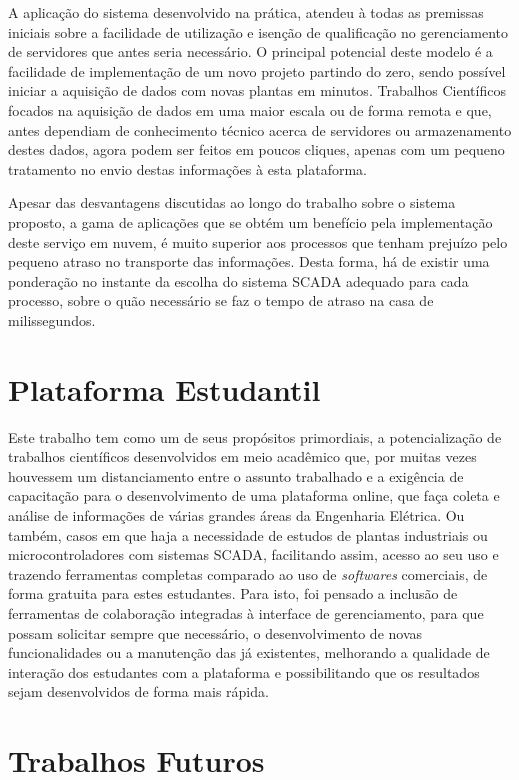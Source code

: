 A aplicação do sistema desenvolvido na prática, atendeu à todas as premissas iniciais sobre a facilidade de utilização e isenção de qualificação no gerenciamento de servidores que antes seria necessário. O principal potencial deste modelo é a facilidade de implementação de um novo projeto partindo do zero, sendo possível iniciar a aquisição de dados com novas plantas em minutos. Trabalhos Científicos focados na aquisição de dados em uma maior escala ou de forma remota e que, antes dependiam de conhecimento técnico acerca de servidores ou armazenamento destes dados, agora podem ser feitos em poucos cliques, apenas com um pequeno tratamento no envio destas informações à esta plataforma.

Apesar das desvantagens discutidas ao longo do trabalho sobre o sistema proposto, a gama de aplicações que se obtém um benefício pela implementação deste serviço em nuvem, é muito superior aos processos que tenham prejuízo pelo pequeno atraso no transporte das informações. Desta forma, há de existir uma ponderação no instante da escolha do sistema \gls{SCADA} adequado para cada processo, sobre o quão necessário se faz o tempo de atraso na casa de milissegundos.

\section{Plataforma Estudantil}
\label{sec:plataforma-estudantil}

Este trabalho tem como um de seus propósitos primordiais, a potencialização de trabalhos científicos desenvolvidos em meio acadêmico que, por muitas vezes houvessem um distanciamento entre o assunto trabalhado e a exigência de capacitação para o desenvolvimento de uma plataforma online, que faça coleta e análise de informações de várias grandes áreas da Engenharia Elétrica. Ou também, casos em que haja a necessidade de estudos de plantas industriais ou microcontroladores com sistemas \gls{SCADA}, facilitando assim, acesso ao seu uso e trazendo ferramentas completas comparado ao uso de \textit{softwares} comerciais, de forma gratuita para estes estudantes. Para isto, foi pensado a inclusão de ferramentas de colaboração integradas à interface de gerenciamento, para que possam solicitar sempre que necessário, o desenvolvimento de novas funcionalidades ou a manutenção das já existentes, melhorando a qualidade de interação dos estudantes com a plataforma e possibilitando  que os resultados sejam desenvolvidos de forma mais rápida.

\section{Trabalhos Futuros}
\label{sec:trabalhos-futuros}

